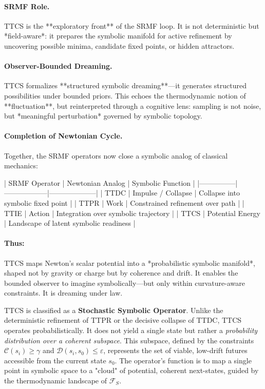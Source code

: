 \begin{scholium}
\paragraph{SRMF Role.} TTCS is the **exploratory front** of the SRMF loop. It is not deterministic but *field-aware*: it prepares the symbolic manifold for active refinement by uncovering possible minima, candidate fixed points, or hidden attractors.

\paragraph{Observer-Bounded Dreaming.} TTCS formalizes **structured symbolic dreaming**—it generates structured possibilities under bounded priors. This echoes the thermodynamic notion of **fluctuation**, but reinterpreted through a cognitive lens: sampling is not noise, but *meaningful perturbation* governed by symbolic topology.

\paragraph{Completion of Newtonian Cycle.} Together, the SRMF operators now close a symbolic analog of classical mechanics:

| SRMF Operator | Newtonian Analog | Symbolic Function |
|---------------|------------------|--------------------|
| TTDC          | Impulse / Collapse | Collapse into symbolic fixed point |
| TTPR          | Work              | Constrained refinement over path |
| TTIE          | Action            | Integration over symbolic trajectory |
| TTCS          | Potential Energy  | Landscape of latent symbolic readiness |

\paragraph{Thus:} TTCS maps Newton’s scalar potential into a *probabilistic symbolic manifold*, shaped not by gravity or charge but by coherence and drift. It enables the bounded observer to imagine symbolically—but only within curvature-aware constraints. It is dreaming under law.

\end{scholium}

\begin{scholium}
\label{scholium:bk4_ttcs_stochastic_operator}
TTCS is classified as a \textbf{Stochastic Symbolic Operator}. Unlike the deterministic refinement of TTPR or the decisive collapse of TTDC, TTCS operates probabilistically. It does not yield a single state but rather a \emph{probability distribution over a coherent subspace}. This subspace, defined by the constraints $\mathcal{C}(s_i) \geq \gamma$ and $\mathcal{D}(s_i, s_0) \leq \varepsilon$, represents the set of viable, low-drift futures accessible from the current state $s_0$. The operator's function is to map a single point in symbolic space to a "cloud" of potential, coherent next-states, guided by the thermodynamic landscape of $\mathcal{F}_S$.
\end{scholium}

